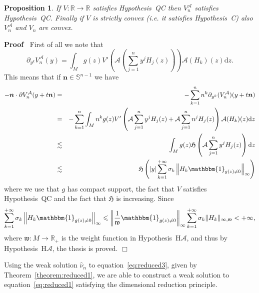 \documentclass[a4paper,10pt]{article}
\newcommand{\mathd}{\mathrm{d}}
\newcommand{\tmmathbf}[1]{\ensuremath{\boldsymbol{#1}}}
\newenvironment{proof}{\noindent\textbf{Proof\ }}{\hspace*{\fill}$\Box$\medskip}
\newtheorem{proposition}[theorem]{Proposition}
{\theorembodyfont{\rmfamily}\newtheorem{remark}[theorem]{Remark}}
\begin{document}
\begin{proposition}
  If $V : \mathbb{R} \rightarrow \mathbb{R}$ satisfies Hypothesis~QC then
  $V_n^{\mathcal{A}}$ satisfies Hypothesis~QC. Finally if $V$ is strictly
  convex (i.e. it satisfies Hypothesis~C) also $V_n^{\mathcal{A}}$ and $V_n$
  are convex.
\end{proposition}

\begin{proof}
  First of all we note that
  \[ \partial_{y^k} V^{\mathcal{A}}_n (y) = \int_M g (z) V' \left( 
     \mathcal{A} \left( \sum_{j = 1}^n y^j H_j (z) \right) \right) \mathcal{A}
     (H_k) (z) \mathd z. \]
  This means that if $\tmmathbf{n} \in \mathbb{S}^{n - 1}$ we have
  \begin{eqnarray}
    -\tmmathbf{n} \cdot \partial V_n^{\mathcal{A}} (y + t\tmmathbf{n}) & = & -
    \sum_{k = 1}^n n^k \partial_{y^k} (V_n^{\mathcal{A}}) (y + t\tmmathbf{n})
    \nonumber\\
    & = & - \sum_{k = 1}^n \int_M n^k g (z) V' \left( \mathcal{A} \sum_{j =
    1}^n y^j H_j (z) + \mathcal{A} \sum_{j = 1}^n n^j H_j (z) \right)
    \mathcal{A} (H_k) (z) \mathd z \nonumber\\
    & \lesssim & \int_M g (z) \mathfrak{H} \left( \mathcal{A} \sum_{j = 1}^n
    y^j H_j (z) \right) \mathd z \nonumber\\
    & \lesssim & \mathfrak{H} \left( | y | \sum_{k = 1}^{+ \infty} \sigma_k
    \left\| H_k \mathbbm{1}_{g (z) \not{=} 0} \right\|_{\infty} \right)
    \nonumber
  \end{eqnarray}
  where we use that $g$ has compact support, the fact that $V$ satisfies
  Hypothesis~QC and the fact that $\mathfrak{H}$ is increasing. Since
  \[ \sum_{k = 1}^{+ \infty} \sigma_k \left\| H_k \mathbbm{1}_{g (z) \not{=}
     0} \right\|_{\infty} \leqslant \left\| \frac{1}{\mathfrak{w}} \mathbbm{1}_{g (z)
     \not{=} 0} \right\|_{\infty} \sum_{k = 1}^{+ \infty} \sigma_k \| H_k
     \|_{\infty, \mathfrak{w}} < + \infty, \]
  where $\mathfrak{w} : M \rightarrow \mathbb{R}_+$ is the weight function in
  Hypothesis~H$\mathcal{A}$, and thus by Hypothesis~H$\mathcal{A}$, the thesis
  is proved.
\end{proof}

Using the weak solution $\hat{\nu}_n$ to equation~{\eqref{eq:reduced3}}, given
by Theorem~\ref{theorem:reduced1}, we are able to construct a weak solution to
equation~{\eqref{eq:reduced1}} satisfying the dimensional reduction principle.
\end{document}
